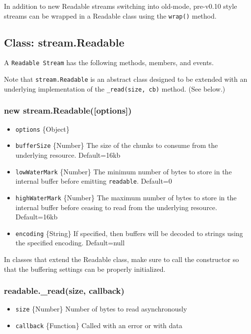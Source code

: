 In addition to new Readable streams switching into old-mode, pre-v0.10
style streams can be wrapped in a Readable class using the
\texttt{wrap()} method.

\subsection{Class: stream.Readable}

A \texttt{Readable Stream} has the following methods, members, and
events.

Note that \texttt{stream.Readable} is an abstract class designed to be
extended with an underlying implementation of the
\texttt{\_read(size, cb)} method. (See below.)

\subsubsection{new stream.Readable({[}options{]})}

\begin{itemize}
\item
  \texttt{options} \{Object\}
\item
  \texttt{bufferSize} \{Number\} The size of the chunks to consume from
  the underlying resource. Default=16kb
\item
  \texttt{lowWaterMark} \{Number\} The minimum number of bytes to store
  in the internal buffer before emitting \texttt{readable}. Default=0
\item
  \texttt{highWaterMark} \{Number\} The maximum number of bytes to store
  in the internal buffer before ceasing to read from the underlying
  resource. Default=16kb
\item
  \texttt{encoding} \{String\} If specified, then buffers will be
  decoded to strings using the specified encoding. Default=null
\end{itemize}

In classes that extend the Readable class, make sure to call the
constructor so that the buffering settings can be properly initialized.

\subsubsection{readable.\_read(size, callback)}

\begin{itemize}
\item
  \texttt{size} \{Number\} Number of bytes to read asynchronously
\item
  \texttt{callback} \{Function\} Called with an error or with data
\end{itemize}

